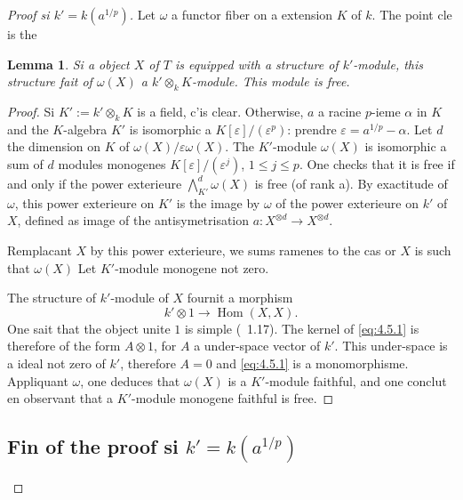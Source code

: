 \documentclass[11pt,a4paper]{article}
\theoremstyle{plain}
\newtheorem{lemma}[theorem]{Lemma}
\theoremstyle{definition}
\DeclareMathOperator{\Hom}{Hom}
\begin{document}
\begin{proof}[Proof si $k' = k(a^{1/p})$]
Let $\omega$ a functor fiber on a extension $K$ of $k$. The point cle is the

\begin{lemma}\label{lem:4.5}
Si a object $X$ of $T$ is equipped with a structure of $k'$-module, this structure fait of $\omega(X)$ a $k' \otimes_k K$-module. This module is free.
\end{lemma}

\begin{proof}
Si $K' := k' \otimes_k K$ is a field, c'is clear. Otherwise, $a$ a racine $p$-ieme $\alpha$ in $K$ and the $K$-algebra $K'$ is isomorphic a $K[\varepsilon]/(\varepsilon^p)$: prendre $\varepsilon = a^{1/p} - \alpha$. Let $d$ the dimension on $K$ of $\omega(X)/\varepsilon\omega(X)$. The $K'$-module $\omega(X)$ is isomorphic a sum of $d$ modules monogenes $K[\varepsilon]/(\varepsilon^j)$, $1 \leq j \leq p$. One checks that it is free if and only if the power exterieure $\bigwedge^d_{K'} \omega(X)$ is free (of rank a). By exactitude of $\omega$, this power exterieure on $K'$ is the image by $\omega$ of the power exterieure on $k'$ of $X$, defined as image of the antisymetrisation $a: X^{\otimes d} \to X^{\otimes d}$.

Remplacant $X$ by this power exterieure, we sums ramenes to the cas or $X$ is such that $\omega(X)$ Let $K'$-module monogene not zero.

The structure of $k'$-module of $X$ fournit a morphism
\begin{equation}\label{eq:4.5.1}
k' \otimes 1 \longrightarrow \Hom(X, X).
\end{equation}
One sait that the object unite $1$ is simple (\cite{DM}~1.17). The kernel of \eqref{eq:4.5.1} is therefore of the form $A \otimes 1$, for $A$ a under-space vector of $k'$. This under-space is a ideal not zero of $k'$, therefore $A = 0$ and \eqref{eq:4.5.1} is a monomorphisme. Appliquant $\omega$, one deduces that $\omega(X)$ is a $K'$-module faithful, and one conclut en observant that a $K'$-module monogene faithful is free.
\end{proof}

\subsection{Fin of the proof si $k' = k(a^{1/p})$}\label{sec:4.6}


\end{proof}
\end{document}
